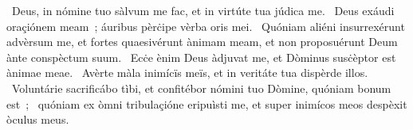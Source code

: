 \psalmChapterWithInscription{}
{ }
{%
~Deus, in nómine tuo sàlvum me fac, et in virtúte tua júdica me. 
~Deus exáudi oraçiónem meam~; áuribus pèrċipe vèrba oris mei. 
~Quóniam aliéni insurrexérunt advèrsum me, et fortes quaesivérunt ànimam meam, et non proposuérunt Deum ànte conspèctum suum. 
~Ecċe ènim Deus àdjuvat me, et Dòminus susċèptor est ànimae meae. 
~Avèrte màla inimícïs meïs, et in veritáte tua dispèrde illos. 
~Voluntárie sacrificábo tìbi, et confitébor nómini tuo Dòmine, quóniam bonum est~; 
~quóniam ex òmni tribulaçióne eripuìsti me, et super inimícos meos despèxit òculus meus. 
}
